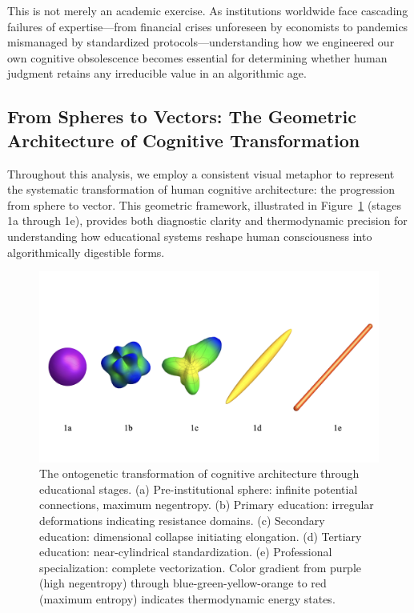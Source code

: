 This is not merely an academic exercise. As institutions worldwide face cascading failures of expertise---from financial crises unforeseen by economists to pandemics mismanaged by standardized protocols---understanding how we engineered our own cognitive obsolescence becomes essential for determining whether human judgment retains any irreducible value in an algorithmic age.

\subsection{From Spheres to Vectors: The Geometric Architecture of Cognitive Transformation}

Throughout this analysis, we employ a consistent visual metaphor to represent the systematic transformation of human cognitive architecture: the progression from sphere to vector. This geometric framework, illustrated in Figure~\ref{fig:sphere-to-vector} (stages 1a through 1e), provides both diagnostic clarity and thermodynamic precision for understanding how educational systems reshape human consciousness into algorithmically digestible forms.

\begin{figure}[ht]
\centering
\includegraphics[width=\textwidth]{../figures/sphere-to-vector.png}
\caption{The ontogenetic transformation of cognitive architecture through educational stages. (a) Pre-institutional sphere: infinite potential connections, maximum negentropy. (b) Primary education: irregular deformations indicating resistance domains. (c) Secondary education: dimensional collapse initiating elongation. (d) Tertiary education: near-cylindrical standardization. (e) Professional specialization: complete vectorization. Color gradient from purple (high negentropy) through blue-green-yellow-orange to red (maximum entropy) indicates thermodynamic energy states.}
\label{fig:sphere-to-vector}
\end{figure}


